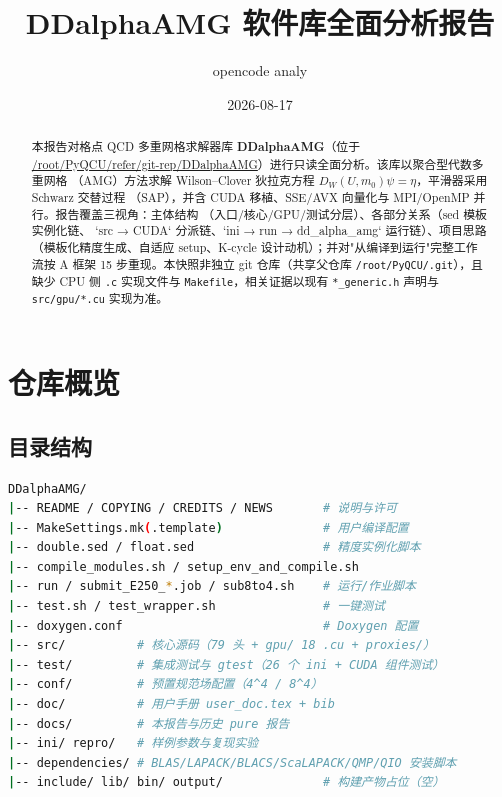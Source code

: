 \documentclass[UTF8]{ctexart}
\title{DDalphaAMG 软件库全面分析报告}
\author{opencode analy}
\date{2026-08-17}
\begin{document}
\maketitle

\begin{abstract}
本报告对格点 QCD 多重网格求解器库 \textbf{DDalphaAMG}（位于
\url{/root/PyQCU/refer/git-rep/DDalphaAMG}）进行只读全面分析。该库以聚合型代数多重网格
（AMG）方法求解 Wilson--Clover 狄拉克方程 $D_W(U,m_0)\psi=\eta$，平滑器采用 Schwarz 交替过程
（SAP），并含 CUDA 移植、SSE/AVX 向量化与 MPI/OpenMP 并行。报告覆盖三视角：\textcolor{struct}{主体结构}
（入口/核心/GPU/测试分层）、\textcolor{relation}{各部分关系}（sed 模板实例化链、
`src → CUDA` 分派链、`ini → run → dd\_alpha\_amg` 运行链）、\textcolor{idea}{项目思路}
（模板化精度生成、自适应 setup、K-cycle 设计动机）；并对"从编译到运行"完整工作流按 A 框架
15 步重现。本快照非独立 git 仓库（共享父仓库 \texttt{/root/PyQCU/.git}），且缺少 CPU 侧
\texttt{.c} 实现文件与 \texttt{Makefile}，相关证据以现有 \texttt{*\_generic.h} 声明与
\texttt{src/gpu/*.cu} 实现为准。
\end{abstract}

\tableofcontents

\section{仓库概览}

\subsection{目录结构}
\begin{lstlisting}[language=bash]
DDalphaAMG/
|-- README / COPYING / CREDITS / NEWS       # 说明与许可
|-- MakeSettings.mk(.template)              # 用户编译配置
|-- double.sed / float.sed                  # 精度实例化脚本
|-- compile_modules.sh / setup_env_and_compile.sh
|-- run / submit_E250_*.job / sub8to4.sh    # 运行/作业脚本
|-- test.sh / test_wrapper.sh               # 一键测试
|-- doxygen.conf                            # Doxygen 配置
|-- src/          # 核心源码（79 头 + gpu/ 18 .cu + proxies/）
|-- test/         # 集成测试与 gtest（26 个 ini + CUDA 组件测试）
|-- conf/         # 预置规范场配置（4^4 / 8^4）
|-- doc/          # 用户手册 user_doc.tex + bib
|-- docs/         # 本报告与历史 pure 报告
|-- ini/ repro/   # 样例参数与复现实验
|-- dependencies/ # BLAS/LAPACK/BLACS/ScaLAPACK/QMP/QIO 安装脚本
|-- include/ lib/ bin/ output/              # 构建产物占位（空）
\end{lstlisting}
\end{document}

